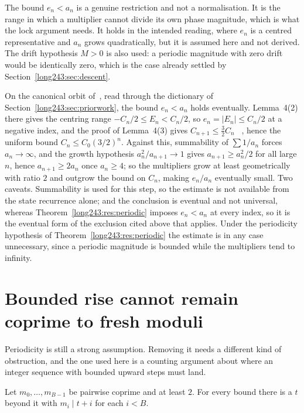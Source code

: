 The bound $e_n<a_n$ is a genuine restriction and not a normalisation.  It is
the range in which a multiplier cannot divide its own phase magnitude, which
is what the lock argument needs.  It holds in the intended reading, where
$e_n$ is a centred representative and $a_n$ grows quadratically, but it is
assumed here and not derived.  The drift hypothesis $M>0$ is also used: a
periodic magnitude with zero drift would be identically zero, which is the case
already settled by Section~\ref{long243:sec:descent}.

\begin{remark}
On the canonical orbit of~\cite{koizumi2025}, read through the dictionary of
Section~\ref{long243:sec:priorwork}, the bound $e_n<a_n$ holds eventually.  Lemma~4(2)
there gives the centring range $-C_n/2\le E_n<C_n/2$, so $e_n=|E_n|\le C_n/2$ at
a negative index, and the proof of Lemma~4(3) gives $C_{n+1}\le\tfrac32C_n$
~\cite[pp.~11--12]{koizumi2025},
hence the uniform bound $C_n\le C_0(3/2)^{n}$.  Against this, summability of
$\sum1/a_n$ forces
$a_n\to\infty$, and the growth hypothesis $a_n^{2}/a_{n+1}\to1$ gives
$a_{n+1}\ge a_n^{2}/2$ for all large $n$, hence $a_{n+1}\ge2a_n$ once
$a_n\ge4$; so the multipliers grow at least geometrically with ratio $2$ and
outgrow the bound on $C_n$, making $e_n/a_n$ eventually small.  Two caveats.
Summability is used for this step, so the estimate is not available from the
state recurrence alone; and the conclusion is eventual and not universal,
whereas Theorem~\ref{long243:res:periodic} imposes $e_n<a_n$ at every index, so it is
the eventual form of the exclusion cited above that applies.  Under the
periodicity hypothesis of Theorem~\ref{long243:res:periodic} the estimate is in any
case unnecessary, since a periodic magnitude is bounded while the multipliers
tend to infinity.
\end{remark}

\section{Bounded rise cannot remain coprime to fresh moduli}\label{long243:sec:barrier}

Periodicity is still a strong assumption.  Removing it needs a different kind
of obstruction, and the one used here is a counting argument about where an
integer sequence with bounded upward steps must land.

\begin{lemma}\label{long243:res:crt}
Let $m_0,\ldots,m_{B-1}$ be pairwise coprime and at least $2$.  For every bound
there is a $t$ beyond it with $m_i\mid t+i$ for each $i<B$.
\end{lemma}

